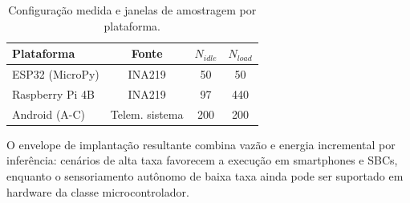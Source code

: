 \begin{table}[t]
\caption{Configuração medida e janelas de amostragem por plataforma.}
\label{tab:energy_setup}
\centering
\footnotesize
\setlength{\tabcolsep}{4pt}
\begin{tabular}{lccc}
\toprule
Plataforma & Fonte & $N_{idle}$ & $N_{load}$ \\
\midrule
ESP32 (MicroPy) & INA219 & 50 & 50 \\
Raspberry Pi 4B & INA219 & 97 & 440 \\
Android (A-C) & Telem. sistema & 200 & 200 \\
\bottomrule
\end{tabular}
\end{table}


O envelope de implantação resultante combina vazão e energia incremental por inferência: cenários de alta taxa favorecem a execução em smartphones e SBCs, enquanto o sensoriamento autônomo de baixa taxa ainda pode ser suportado em hardware da classe microcontrolador.
